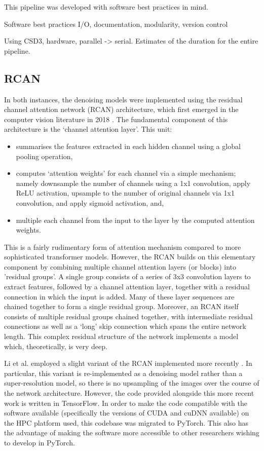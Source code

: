 \documentclass[12pt]{article}
\begin{document}
This pipeline was developed with software best practices in mind.


Software best practices
I/O, documentation, modularity, version control

Using CSD3, hardware, parallel -> serial.
Estimates of the duration for the entire pipeline.

\subsection{RCAN}

In both instances, the denoising models were implemented using the residual channel attention network (RCAN) architecture,
which first emerged in the computer vision literature in 2018 \cite{rcan2018}.
The fundamental component of this architecture is the `channel attention layer'.
This unit:

\begin{itemize}
    \item summarises the features extracted in each hidden channel using a global pooling operation,
    \item computes `attention weights' for each channel via a simple mechanism;
    namely downsample the number of channels using a 1x1 convolution,
    apply ReLU activation,
    upsample to the number of original channels via 1x1 convolution,
    and apply sigmoid activation, and,
    \item multiple each channel from the input to the layer by the computed attention weights.
\end{itemize}

This is a fairly rudimentary form of attention mechanism compared to more sophisticated transformer models.
However, the RCAN builds on this elementary component by combining multiple channel attention layers (or blocks) into 'residual groups'.
A single group consists of a series of 3x3 convolution layers to extract features,
followed by a channel attention layer, together with a residual connection in which the input is added.
Many of these layer sequences are chained together to form a single residual group.
Moreover, an RCAN itself consists of multiple residual groups chained together,
with intermediate residual connections as well as a `long' skip connection which spans the entire network length.
This complex residual structure of the network implements a model which, theoretically, is very deep.

Li et al. employed a slight variant of the RCAN implemented more recently \cite{rcan2021}.
In particular, this variant is re-implemented as a denoising model rather than a super-resolution model,
so there is no upsampling of the images over the course of the network architecture.
However, the code provided alongside this more recent work is written in TensorFlow.
In order to make the code compatible with the software available (specifically the versions of CUDA and cuDNN available) on the HPC platform used,
this codebase was migrated to PyTorch.
This also has the advantage of making the software more accessible to other researchers wishing to develop in PyTorch.
\end{document}
